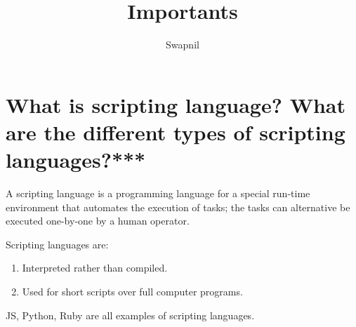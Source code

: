 \documentclass[14pt]{article}
\title{Importants}
\author{Swapnil}
\begin{document}
\maketitle

{\parindent0pt

\section{What is scripting language? What are the different types of scripting languages?***}
A scripting language is a programming language for a special run-time environment that automates the execution of tasks; the tasks can alternative be executed one-by-one by a human operator. 

Scripting languages are:
\begin{enumerate}
  \item Interpreted rather than compiled.
  \item Used for short scripts over full computer programs.
\end{enumerate}
JS, Python, Ruby are all examples of scripting languages.

}
\end{document}
